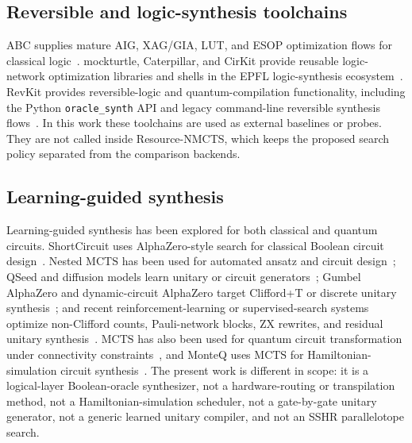 \documentclass[11pt]{article}
\newcommand{\method}{Resource-NMCTS}
\newcommand{\mcts}{\ensuremath{\mathrm{MCTS}}}
\begin{document}
\subsection{Reversible and logic-synthesis toolchains}

ABC supplies mature AIG, XAG/GIA, LUT, and ESOP optimization flows for
classical logic~\cite{brayton2010abc}.  mockturtle, Caterpillar, and CirKit provide reusable
logic-network optimization libraries and shells in the EPFL logic-synthesis
ecosystem~\cite{soeken2018epfl,mockturtle,caterpillar,cirkit}.  RevKit provides
reversible-logic and quantum-compilation functionality,
including the Python \texttt{oracle\_synth} API and legacy command-line
reversible synthesis flows~\cite{soeken2012revkit,revkit}.  In this work these
toolchains are used as external baselines or probes.  They are not called
inside \method{}, which keeps the proposed search policy separated from the
comparison backends.

\subsection{Learning-guided synthesis}

Learning-guided synthesis has been explored for both classical and quantum
circuits.  ShortCircuit uses AlphaZero-style search for classical Boolean
circuit design~\cite{tsaras2024shortcircuit}.  Nested \mcts{} has been used for
automated ansatz and circuit design~\cite{wang2023nestedmcts}; QSeed and
diffusion models learn unitary or circuit generators~\cite{weiden2023qseed,furrutter2024diffusion};
Gumbel AlphaZero and dynamic-circuit AlphaZero target Clifford+T or discrete
unitary synthesis~\cite{rietsch2024unitary,valcarce2025dynamic}; and recent
reinforcement-learning or supervised-search systems optimize non-Clifford
counts, Pauli-network blocks, ZX rewrites, and residual unitary
synthesis~\cite{kremer2025nonclifford,dubal2025paulinetwork,riu2025rlzx,theissinger2026beyondrl}.
\mcts{} has also been used for quantum circuit transformation under
connectivity constraints~\cite{zhou2022qctmcts}, and MonteQ uses \mcts{} for
Hamiltonian-simulation circuit synthesis~\cite{machiya2026monteq}.  The
present work is different in scope: it is a logical-layer Boolean-oracle
synthesizer, not a hardware-routing or transpilation method, not a
Hamiltonian-simulation scheduler, not a gate-by-gate unitary generator, not a
generic learned unitary compiler, and not an SSHR parallelotope search.
\end{document}
